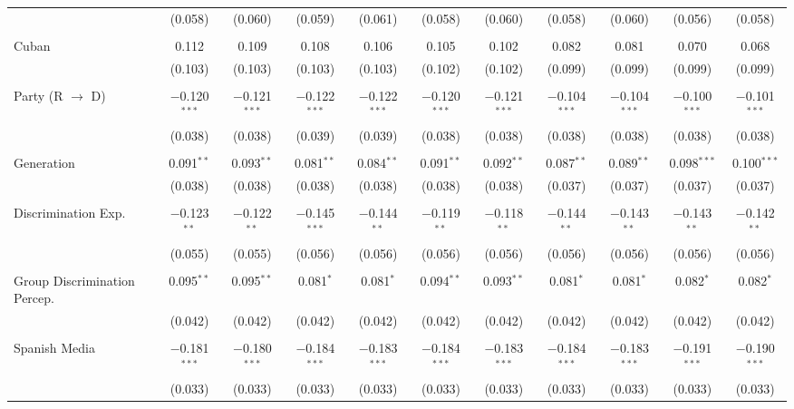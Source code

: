 \begin{table}[!htbp]
\begin{tabular}{@{\extracolsep{5pt}}lcccccccccc}
  & (0.058) & (0.060) & (0.059) & (0.061) & (0.058) & (0.060) & (0.058) & (0.060) & (0.056) & (0.058) \\ 
  & & & & & & & & & & \\ 
 Cuban & 0.112 & 0.109 & 0.108 & 0.106 & 0.105 & 0.102 & 0.082 & 0.081 & 0.070 & 0.068 \\ 
  & (0.103) & (0.103) & (0.103) & (0.103) & (0.102) & (0.102) & (0.099) & (0.099) & (0.099) & (0.099) \\ 
  & & & & & & & & & & \\ 
 Party (R $\longrightarrow$ D) & $-$0.120$^{***}$ & $-$0.121$^{***}$ & $-$0.122$^{***}$ & $-$0.122$^{***}$ & $-$0.120$^{***}$ & $-$0.121$^{***}$ & $-$0.104$^{***}$ & $-$0.104$^{***}$ & $-$0.100$^{***}$ & $-$0.101$^{***}$ \\ 
  & (0.038) & (0.038) & (0.039) & (0.039) & (0.038) & (0.038) & (0.038) & (0.038) & (0.038) & (0.038) \\ 
  & & & & & & & & & & \\ 
 Generation & 0.091$^{**}$ & 0.093$^{**}$ & 0.081$^{**}$ & 0.084$^{**}$ & 0.091$^{**}$ & 0.092$^{**}$ & 0.087$^{**}$ & 0.089$^{**}$ & 0.098$^{***}$ & 0.100$^{***}$ \\ 
  & (0.038) & (0.038) & (0.038) & (0.038) & (0.038) & (0.038) & (0.037) & (0.037) & (0.037) & (0.037) \\ 
  & & & & & & & & & & \\ 
 Discrimination Exp. & $-$0.123$^{**}$ & $-$0.122$^{**}$ & $-$0.145$^{***}$ & $-$0.144$^{**}$ & $-$0.119$^{**}$ & $-$0.118$^{**}$ & $-$0.144$^{**}$ & $-$0.143$^{**}$ & $-$0.143$^{**}$ & $-$0.142$^{**}$ \\ 
  & (0.055) & (0.055) & (0.056) & (0.056) & (0.056) & (0.056) & (0.056) & (0.056) & (0.056) & (0.056) \\ 
  & & & & & & & & & & \\ 
 Group Discrimination Percep. & 0.095$^{**}$ & 0.095$^{**}$ & 0.081$^{*}$ & 0.081$^{*}$ & 0.094$^{**}$ & 0.093$^{**}$ & 0.081$^{*}$ & 0.081$^{*}$ & 0.082$^{*}$ & 0.082$^{*}$ \\ 
  & (0.042) & (0.042) & (0.042) & (0.042) & (0.042) & (0.042) & (0.042) & (0.042) & (0.042) & (0.042) \\ 
  & & & & & & & & & & \\ 
 Spanish Media & $-$0.181$^{***}$ & $-$0.180$^{***}$ & $-$0.184$^{***}$ & $-$0.183$^{***}$ & $-$0.184$^{***}$ & $-$0.183$^{***}$ & $-$0.184$^{***}$ & $-$0.183$^{***}$ & $-$0.191$^{***}$ & $-$0.190$^{***}$ \\ 
  & (0.033) & (0.033) & (0.033) & (0.033) & (0.033) & (0.033) & (0.033) & (0.033) & (0.033) & (0.033) \\ 

\end{tabular}
\end{table}
